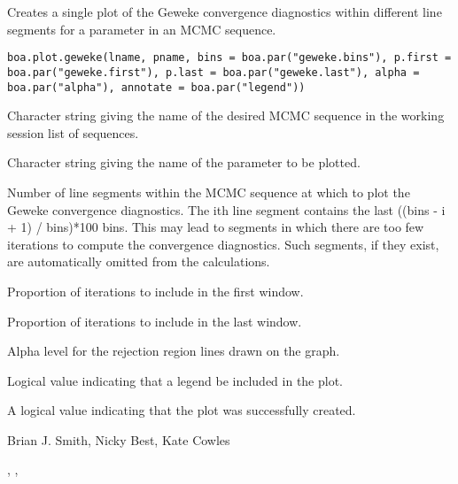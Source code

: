 \begin{Description}\relax
Creates a single plot of the Geweke convergence diagnostics within different 
line segments for a parameter in an MCMC sequence.
\end{Description}
\begin{Usage}
\begin{verbatim}
boa.plot.geweke(lname, pname, bins = boa.par("geweke.bins"), p.first = boa.par("geweke.first"), p.last = boa.par("geweke.last"), alpha = boa.par("alpha"), annotate = boa.par("legend"))
\end{verbatim}
\end{Usage}
\begin{Arguments}
\begin{ldescription}
\item[\code{lname}] Character string giving the name of the desired MCMC sequence in 
the working session list of sequences.
\item[\code{pname}] Character string giving the name of the parameter to be plotted.
\item[\code{bins}] Number of line segments within the MCMC sequence at which to plot 
the Geweke convergence diagnostics. The ith line segment contains the last 
((bins - i + 1) / bins)*100
bins. This may lead to segments in which there are too few iterations to 
compute the convergence diagnostics. Such segments, if they exist, are 
automatically omitted from the calculations.
\item[\code{p.first}] Proportion of iterations to include in the first window.
\item[\code{p.last}] Proportion of iterations to include in the last window.
\item[\code{alpha}] Alpha level for the rejection region lines drawn on the graph.
\item[\code{annotate}] Logical value indicating that a legend be included in the plot.
\end{ldescription}
\end{Arguments}
\begin{Value}
A logical value indicating that the plot was successfully created.
\end{Value}
\begin{Author}\relax
Brian J. Smith, Nicky Best, Kate Cowles
\end{Author}
\begin{SeeAlso}\relax
{}, ,
\end{SeeAlso}

